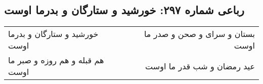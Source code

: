 \begin{center}
\section*{رباعی شماره ۲۹۷: خورشید و ستارگان و بدرما اوست}
\label{sec:0297}
\begin{longtable}{l p{0.5cm} r}
خورشید و ستارگان و بدرما اوست
&&
بستان و سرای و صحن و صدر ما اوست
\\
هم قبله و هم روزه و صبر ما اوست
&&
عید رمضان و شب قدر ما اوست
\\
\end{longtable}
\end{center}
